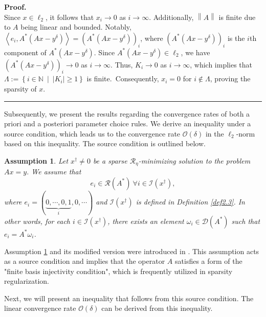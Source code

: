 \documentclass[a4paper,12pt]{article}
\newtheorem{assumption}[theorem]{Assumption}
\numberwithin{equation}{section}
\newenvironment{proof}[1][Proof]{\textbf{#1.} }
{\ \rule{0.75em}{0.75em}\smallskip}
\begin{document}
\begin{proof}
\begin{equation*}
    \end{equation*}
    Since $x\in\ell_{2}$, it follows that $x_{i}\rightarrow 0$ as $i\rightarrow \infty$. Additionally, $\left\|A\right\|$ is finite due to $A$ being linear and bounded. Notably, $\left<e_{i}, A^{*}\left(Ax-y^{\delta}\right)\right>= \left(A^{*}\left(Ax-y^{\delta}\right)\right)_{i}$, where $\left(A^{*}\left(Ax-y^{\delta}\right)\right)_{i}$ is the $i$th component of $A^{*}\left(Ax-y^{\delta}\right)$. Since $A^{*}\left(Ax-y^{\delta}\right)\in\ell_{2}$, we have  $\left(A^{*}\left(Ax-y^{\delta}\right)\right)_{i}\rightarrow 0$ as $i\rightarrow \infty$. Thus, $K_{i}\rightarrow 0$ as $i\rightarrow \infty$, which implies that $\Lambda:=\left\{i\in\mathbb{N}\ \mid\ \left|K_{i}\right|\geq 1\right\}$ is finite.\ Consequently, $x_{i}=0$ for $i\notin\Lambda$, proving the sparsity of $x$.
\end{proof}

\par Subsequently, we present the results regarding the convergence rates of both a priori and a posteriori parameter choice rules. We derive an inequality under a source condition, which leads us to the convergence rate $\mathcal{O}\left(\delta\right)$ in the $\ell_{2}$-norm based on this inequality. The source condition is outlined below. 

\begin{assumption}\label{ass3.5}
    Let $x^{\dagger}\neq 0$ be a sparse $\mathcal{R}_{\eta}$-minimizing solution to the problem $Ax=y$. We assume that
    \begin{equation*}
        e_{i}\in\mathcal{R}\left(A^{*}\right)\ \forall i\in\mathcal{I}(x^{\dagger}),
    \end{equation*}
    where $e_{i}=(\underbrace{0,\cdots,0,1}_{i},0,\cdots)$ and $\mathcal{I}\left(x^{\dagger}\right)$ is defined in Definition \ref{def2.3}. In other words, for each $i\in\mathcal{I}\left(x^{\dagger}\right)$, there exists an element $\omega_{i}\in\mathcal{D}\left(A^{*}\right)$ such that $e_{i}=A^{*}\omega_{i}$.
\end{assumption}
\par Assumption \ref{ass3.5} and its modified version were introduced in \cite{BL09,G09}. This assumption acts as a source condition and implies that the operator $A$ satisfies a form of the "finite basis injectivity condition", which is frequently utilized in sparsity regularization.
\par Next, we will present an inequality that follows from this source condition. The linear convergence rate $\mathcal{O}\left(\delta\right)$ can be derived from this inequality.
\end{document}
